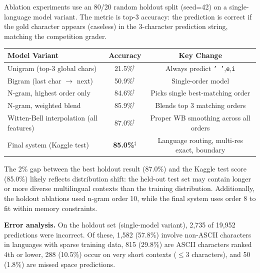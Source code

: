 \documentclass[11pt]{article}
\begin{document}
Ablation experiments use an 80/20 random holdout split (seed=42) on a single-language model variant. The metric is top-3 accuracy: the prediction is correct if the gold character appears (caseless) in the 3-character prediction string, matching the competition grader.

\begin{table}[h]
\centering
\small
\begin{tabular}{lcc}
\toprule
\textbf{Model Variant} & \textbf{Accuracy} & \textbf{Key Change} \\
\midrule
Unigram (top-3 global chars) & 21.5\%$^\dagger$ & Always predict \texttt{' '},\texttt{e},\texttt{i} \\
Bigram (last char $\to$ next) & 50.9\%$^\dagger$ & Single-order model \\
N-gram, highest order only & 84.6\%$^\dagger$ & Picks single best-matching order \\
N-gram, weighted blend & 85.9\%$^\dagger$ & Blends top 3 matching orders \\
Witten-Bell interpolation (all features) & 87.0\%$^\dagger$ & Proper WB smoothing across all orders \\
\midrule
Final system (Kaggle test) & \textbf{85.0\%}$^\ddagger$ & Language routing, multi-res exact, boundary \\
\bottomrule
\end{tabular}
\end{table}


\vspace{2pt}
\noindent The 2\% gap between the best holdout result (87.0\%) and the Kaggle test score (85.0\%) likely reflects distribution shift: the held-out test set may contain longer or more diverse multilingual contexts than the training distribution. Additionally, the holdout ablations used n-gram order 10, while the final system uses order 8 to fit within memory constraints.

\textbf{Error analysis.}
On the holdout set (single-model variant), 2,735 of 19,952 predictions were incorrect. Of these, 1,582 (57.8\%) involve non-ASCII characters in languages with sparse training data, 815 (29.8\%) are ASCII characters ranked 4th or lower, 288 (10.5\%) occur on very short contexts ($\leq$3 characters), and 50 (1.8\%) are missed space predictions.
\end{document}
